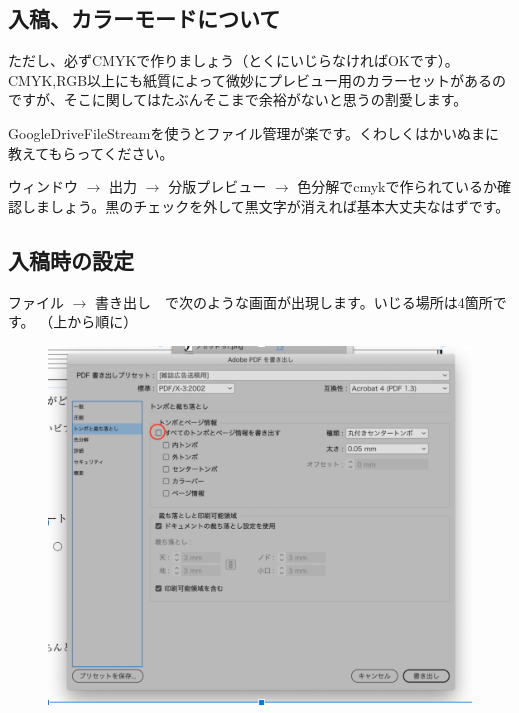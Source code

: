 \documentclass[dvipdfmx,jb5]{jarticle}
\begin{document}
\subsection{入稿、カラーモードについて}
ただし、必ずCMYKで作りましょう（とくにいじらなければOKです）。CMYK,RGB以上にも紙質によって微妙にプレビュー用のカラーセットがあるのですが、そこに関してはたぶんそこまで余裕がないと思うの割愛します。

GoogleDriveFileStreamを使うとファイル管理が楽です。くわしくはかいぬまに教えてもらってください。

ウィンドウ $\rightarrow$ 出力 $\rightarrow$ 分版プレビュー $\rightarrow$ 色分解でcmykで作られているか確認しましょう。黒のチェックを外して黒文字が消えれば基本大丈夫なはずです。


\subsection{入稿時の設定}
ファイル $\rightarrow$ 書き出し　で次のような画面が出現します。いじる場所は4箇所です。
（上から順に）
\begin{figure}[H]
  \includegraphics[scale=0.7]{assets/pmh1.png}
\end{figure}
\end{document}
